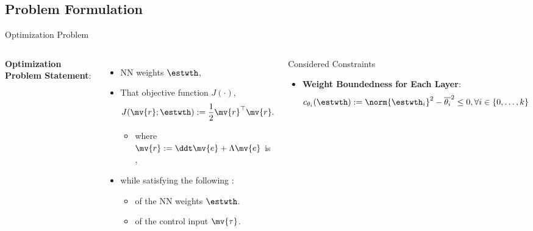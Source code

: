 \documentclass[8pt, aspectratio=169]{beamer}
\newcommand{\ctxt}[2]{\color{#1}{#2}\color{black}}
\begin{document}
\subsection{Problem Formulation}

\begin{frame}{\insertsubsectionhead}{Optimization Problem}

\begin{columns}


    \textbf{Optimization Problem Statement}:

    \begin{itemize}
      \item \ctxt{awesome}{Find } NN weights $\estwth$,
      \item That \ctxt{airforceblue}{minimize } objective function $J(\cdot)$,
        \begin{equation}\label{eq:obj}
          J(\mv{r};\estwth)
          := 
          \frac{1}{2} \mv{r}^\top \mv{r}.
        \end{equation}
        \begin{itemize}
          \item where $\mv{r} := \ddt\mv{e} + \Lambda\mv{e}$ is \ctxt{awesome}{filtered tracking error},
        \end{itemize}
      \item while satisfying the following \ctxt{awesome}{constraints}:
        \begin{itemize}
          \item \ctxt{airforceblue}{Boundedness } of the NN weights $\estwth$.
          \item \ctxt{airforceblue}{Saturation } of the control input $\mv{\tau}$.
        \end{itemize}
    \end{itemize}

  

  {
    \begin{block}{Considered Constraints}

      \begin{itemize}
        \item \textbf{Weight Boundedness for Each Layer}: 
          \begin{equation}\label{eq:cstr:weight}
            c_{\theta_i}(\estwth)
            :=
            \norm{\estwth_i}^2 - \overline{\theta_i}^2 \le 0
            , 
            \forall i\in\{0,\ldots,k\}
          \end{equation}


\end{itemize}
\end{block}}
\end{columns}
\end{frame}
\end{document}
